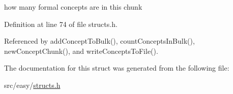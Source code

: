 how many formal concepts are in this chunk 



\-Definition at line 74 of file structs.\-h.



\-Referenced by add\-Concept\-To\-Bulk(), count\-Concepts\-In\-Bulk(), new\-Concept\-Chunk(), and write\-Concepts\-To\-File().



\-The documentation for this struct was generated from the following file\-:\begin{DoxyCompactItemize}
\item 
src/easy/\hyperlink{easy_2structs_8h}{structs.\-h}\end{DoxyCompactItemize}
